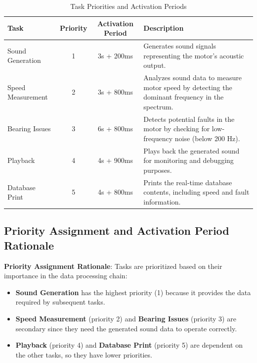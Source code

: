 \documentclass[a4paper,12pt]{article}
\begin{document}
\begin{table}[H]
    \centering
    \begin{tabular}{|l|c|c|p{5cm}|}
        \hline
        \textbf{Task} & \textbf{Priority} & \textbf{Activation Period} & \textbf{Description} \\
        \hline
        Sound Generation    & 1 & 3s + 200ms  & Generates sound signals representing the motor's acoustic output. \\
        \hline
        Speed Measurement   & 2 & 3s + 800ms & Analyzes sound data to measure motor speed by detecting the dominant frequency in the spectrum. \\
        \hline
        Bearing Issues      & 3 & 6s + 800ms & Detects potential faults in the motor by checking for low-frequency noise (below 200 Hz). \\
        \hline
        Playback            & 4 & 4s + 900ms & Plays back the generated sound for monitoring and debugging purposes. \\
        \hline
        Database Print      & 5 & 4s + 800ms & Prints the real-time database contents, including speed and fault information. \\
        \hline
    \end{tabular}
    \caption{Task Priorities and Activation Periods}
    \label{tab:task_priorities}
\end{table}

\subsection{Priority Assignment and Activation Period Rationale}

\textbf{Priority Assignment Rationale}: Tasks are prioritized based on their importance in the data processing chain:
\begin{itemize}
    \item \textbf{Sound Generation} has the highest priority (1) because it provides the data required by subsequent tasks.
    \item \textbf{Speed Measurement} (priority 2) and \textbf{Bearing Issues} (priority 3) are secondary since they need the generated sound data to operate correctly.
    \item \textbf{Playback} (priority 4) and \textbf{Database Print} (priority 5) are dependent on the other tasks, so they have lower priorities.
\end{itemize}
\end{document}
